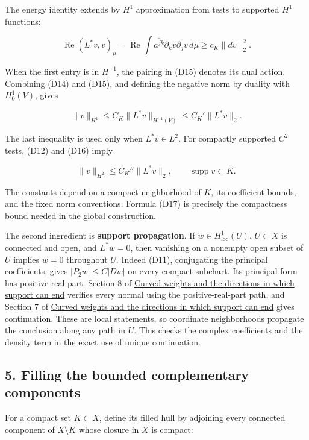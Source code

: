 \documentclass[
  11pt,
]{article}
\begin{document}
The energy identity extends by \(H^1\) approximation from tests to
supported \(H^1\) functions:

\[
 \operatorname{Re}(L^*v,v)_\mu
       =\operatorname{Re}\int\overline{a^{jk}}\partial_kv
                          \overline{\partial_jv}\,d\mu
       \geq c_K\|dv\|_2^2.                                     \tag{D15}
\]

When the first entry is in \(H^{-1}\), the pairing in (D15) denotes its
dual action. Combining (D14) and (D15), and defining the negative norm
by duality with \(H_0^1(V)\), gives

\[
 \|v\|_{H^1}\leq C_K\|L^*v\|_{H^{-1}(V)}
                   \leq C_K'\|L^*v\|_2.                        \tag{D16}
\]

The last inequality is used only when \(L^*v\in L^2\). For compactly
supported \(C^2\) tests, (D12) and (D16) imply

\[
                   \|v\|_{H^2}\leq C_K''\|L^*v\|_2,
                         \qquad\operatorname{supp}v\subset K.   \tag{D17}
\]

The constants depend on a compact neighborhood of \(K\), its coefficient
bounds, and the fixed norm conventions. Formula (D17) is precisely the
compactness bound needed in the global construction.

The second ingredient is \textbf{support propagation}. If
\(w\in H^1_{\mathrm{loc}}(U)\), \(U\subset X\) is connected and open,
and \(L^*w=0\), then vanishing on a nonempty open subset of \(U\)
implies \(w=0\) throughout \(U\). Indeed (D11), conjugating the
principal coefficients, gives \(|P_2w|\leq C|Dw|\) on every compact
subchart. Its principal form has positive real part. Section 8 of
\href{support-continuation.pdf}{Curved weights and the directions in
which support can end} verifies every normal using the
positive-real-part path, and Section 7 of
\href{support-continuation.pdf}{Curved weights and the directions in
which support can end} gives continuation. These are local statements,
so coordinate neighborhoods propagate the conclusion along any path in
\(U\). This checks the complex coefficients and the density term in the
exact use of unique continuation.

\subsection{5. Filling the bounded complementary
components}\label{filling-the-bounded-complementary-components}

For a compact set \(K\subset X\), define its filled hull by adjoining
every connected component of \(X\setminus K\) whose closure in \(X\) is
compact:
\end{document}

